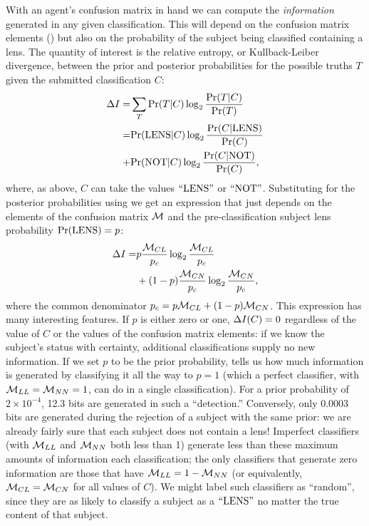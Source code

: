 \documentclass[useAMS,usenatbib,a4paper]{mn2e}
\begin{document}
With an agent's confusion matrix in hand we can compute the
\emph{information} generated in any given classification. This will
depend on the confusion matrix elements () but also on
the probability of the subject being classified containing a lens. The
quantity of interest is the relative entropy, or Kullback-Leiber
divergence, between the prior and
posterior probabilities for the possible truths $T$
given the submitted classification $C$:
\begin{align}
\Delta I =& \sum_T {\rm Pr}(T|C) \log_2 \frac{{\rm Pr}(T|C)}{{\rm Pr}(T)}     \notag \\
             =&    {\rm Pr}({\rm LENS}|C) \log_2 \frac{{\rm Pr}(C|{\rm LENS})}{{\rm Pr}(C)} \notag \\
             +&    {\rm Pr}({\rm NOT}|C)  \log_2 \frac{{\rm Pr}(C|{\rm NOT})}{{\rm Pr}(C)},
\end{align}
where, as above, $C$ can take the values ${\rm ``LENS"}$ or ${\rm ``NOT"}$. 
Substituting for the posterior probabilities using  we get
an expression that just depends on the elements of the 
confusion matrix $\mathcal{M}$ and the pre-classification subject lens
probability ${\rm Pr}({\rm LENS}) = p$:
\begin{align}
\Delta I =    &     p \frac{\mathcal{M}_{CL}}{p_c} \log_2 \frac{\mathcal{M}_{CL}}{p_c}  \notag \\
                  & +(1-p)\frac{\mathcal{M}_{CN}}{p_c} \log_2 \frac{\mathcal{M}_{CN}}{p_c},
  \label{eq:app:infogain}
\end{align}
where the common denominator $p_c = p\mathcal{M}_{CL} + (1-p)\mathcal{M}_{CN}$. This
expression has many interesting features.  If $p$ is either zero or one,
$\Delta I(C) = 0$  regardless of the value of $C$ or the values of
the confusion matrix elements: if we know the subject's status with
certainty, additional classifications supply no new information. If we
set $p$ to be the prior probability,  tells us how
much information is generated by classifying it all the way to $p = 1$
(which a perfect classifier, with $\mathcal{M}_{LL} = \mathcal{M}_{NN} = 1$, can do in a
single classification). For a prior probability of $2\times 10^{-4}$, 
12.3 bits are generated in such a ``detection.''  Conversely, only
0.0003 bits are generated during the rejection of a subject with the
same prior: we are already fairly sure that each subject does not
contain a lens! Imperfect classifiers (with $\mathcal{M}_{LL}$ and $\mathcal{M}_{NN}$
both less than 1)  generate less than these maximum amounts of
information each classification; the only classifiers that generate zero
information are those that have $\mathcal{M}_{LL} = 1 - \mathcal{M}_{NN}$ (or
equivalently, $\mathcal{M}_{CL} = \mathcal{M}_{CN}$ for all values of $C$). We might
label such classifiers as ``random'', since they are as likely to
classify a subject as a ${\rm ``LENS"}$ no matter the true content of that
subject. 
\end{document}
